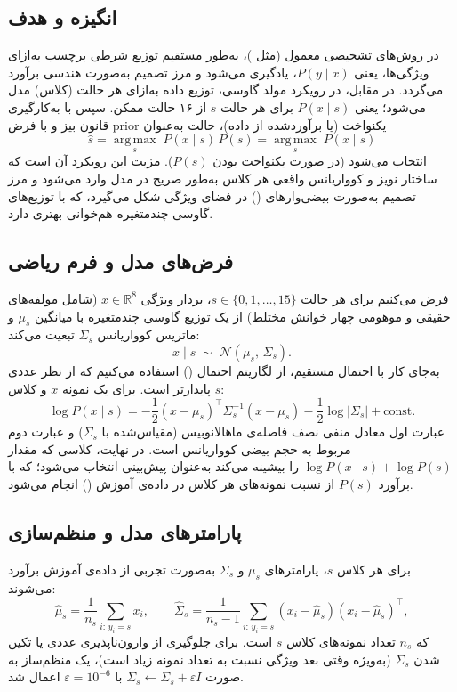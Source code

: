 \subsection{انگیزه و هدف}
در روش‌های تشخیصی معمول (مثل )، به‌طور مستقیم توزیع شرطی برچسب به‌ازای ویژگی‌ها، یعنی $P(y \mid x)$، یادگیری می‌شود و مرز تصمیم به‌صورت هندسی برآورد می‌گردد. در مقابل، در رویکرد مولد گاوسی، توزیع داده به‌ازای هر حالت (کلاس) مدل می‌شود؛ یعنی $P(x \mid s)$ برای هر حالت $s$ از ۱۶ حالت ممکن. سپس با به‌کارگیری قانون بیز و با فرض prior یکنواخت (یا برآوردشده از داده)، حالت به‌عنوان
\begin{equation}
	\hat{s} = \operatorname*{arg\,max}_{s} \; P(x \mid s)\, P(s) = \operatorname*{arg\,max}_{s} \; P(x \mid s)
	\label{eq:bayes-decoder}
\end{equation}
انتخاب می‌شود (در صورت یکنواخت بودن $P(s)$). مزیت این رویکرد آن است که ساختار نویز و کوواریانس واقعی هر کلاس به‌طور صریح در مدل وارد می‌شود و مرز تصمیم به‌صورت بیضی‌وارهای () در فضای ویژگی شکل می‌گیرد، که با توزیع‌های گاوسی چندمتغیره هم‌خوانی بهتری دارد.

\subsection{فرض‌های مدل و فرم ریاضی}
فرض می‌کنیم برای هر حالت $s \in \{0,1,\ldots,15\}$، بردار ویژگی $x \in \mathbb{R}^8$ (شامل مولفه‌های حقیقی و موهومی چهار خوانش مختلط) از یک توزیع گاوسی چندمتغیره با میانگین $\mu_s$ و ماتریس کوواریانس $\Sigma_s$ تبعیت می‌کند:
\begin{equation}
	x \mid s \;\sim\; \mathcal{N}(\mu_s,\, \Sigma_s).
	\label{eq:gaussian-class}
\end{equation}
به‌جای کار با احتمال مستقیم، از لگاریتم احتمال () استفاده می‌کنیم که از نظر عددی پایدارتر است. برای یک نمونه $x$ و کلاس $s$:
\begin{equation}
	\log P(x \mid s) = -\frac{1}{2}(x - \mu_s)^\top \Sigma_s^{-1} (x - \mu_s) - \frac{1}{2} \log |\Sigma_s| + \mathrm{const}.
	\label{eq:log-likelihood}
\end{equation}
عبارت اول معادل منفی نصف فاصله‌ی ماهالانوبیس (مقیاس‌شده با $\Sigma_s$) و عبارت دوم مربوط به حجم بیضی کوواریانس است. در نهایت، کلاسی که مقدار $\log P(x \mid s) + \log P(s)$ را بیشینه می‌کند به‌عنوان پیش‌بینی انتخاب می‌شود؛ که با برآورد $P(s)$ از نسبت نمونه‌های هر کلاس در داده‌ی آموزش () انجام می‌شود.

\subsection{پارامترهای مدل و منظم‌سازی}
برای هر کلاس $s$، پارامترهای $\mu_s$ و $\Sigma_s$ به‌صورت تجربی از داده‌ی آموزش برآورد می‌شوند:
\begin{equation}
	\hat{\mu}_s = \frac{1}{n_s} \sum_{i:\, y_i = s} x_i, \qquad \hat{\Sigma}_s = \frac{1}{n_s-1} \sum_{i:\, y_i = s} (x_i - \hat{\mu}_s)(x_i - \hat{\mu}_s)^\top,
	\label{eq:mean-cov}
\end{equation}
که $n_s$ تعداد نمونه‌های کلاس $s$ است. برای جلوگیری از وارون‌ناپذیری عددی یا تکین شدن $\Sigma_s$ (به‌ویژه وقتی بعد ویژگی نسبت به تعداد نمونه زیاد است)، یک منظم‌ساز به صورت $\Sigma_s \leftarrow \Sigma_s + \varepsilon I$ با $\varepsilon = 10^{-6}$ اعمال شد.

